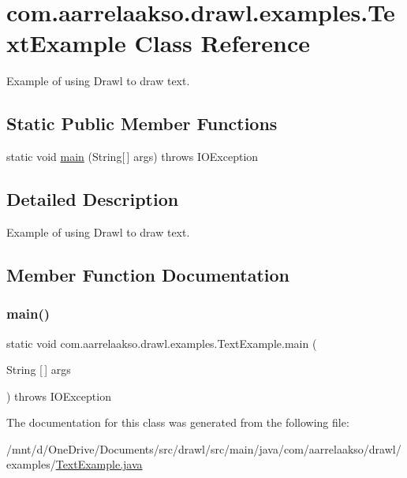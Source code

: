 \hypertarget{classcom_1_1aarrelaakso_1_1drawl_1_1examples_1_1_text_example}{}\section{com.\+aarrelaakso.\+drawl.\+examples.\+Text\+Example Class Reference}
\label{classcom_1_1aarrelaakso_1_1drawl_1_1examples_1_1_text_example}


Example of using Drawl to draw text.  


\subsection*{Static Public Member Functions}
\begin{DoxyCompactItemize}
\item 
static void \hyperlink{classcom_1_1aarrelaakso_1_1drawl_1_1examples_1_1_text_example_a2e2d015e0b517c107a9afdedf82f92f2}{main} (String\mbox{[}$\,$\mbox{]} args)  throws I\+O\+Exception 
\end{DoxyCompactItemize}


\subsection{Detailed Description}
Example of using Drawl to draw text. 

\subsection{Member Function Documentation}
\mbox{\label{classcom_1_1aarrelaakso_1_1drawl_1_1examples_1_1_text_example_a2e2d015e0b517c107a9afdedf82f92f2}} 
\subsubsection{\texorpdfstring{main()}{main()}}
{\footnotesize\ttfamily static void com.\+aarrelaakso.\+drawl.\+examples.\+Text\+Example.\+main (\begin{DoxyParamCaption}\item[{String \mbox{[}$\,$\mbox{]}}]{args }\end{DoxyParamCaption}) throws I\+O\+Exception\hspace{0.3cm}{\ttfamily [static]}}



The documentation for this class was generated from the following file\+:\begin{DoxyCompactItemize}
\item 
/mnt/d/\+One\+Drive/\+Documents/src/drawl/src/main/java/com/aarrelaakso/drawl/examples/\hyperlink{_text_example_8java}{Text\+Example.\+java}\end{DoxyCompactItemize}
